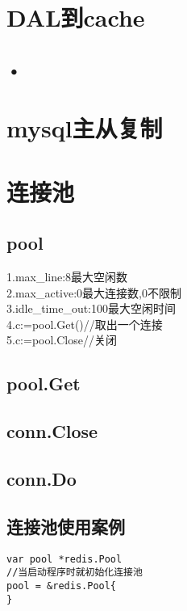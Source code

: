 \documentclass[12pt,a4paper,openany,fleqn]{book} %
\begin{document}
  
\tableofcontents

%
\chapter{DAL到cache}
\section{•}

%
\chapter{mysql主从复制}

%
\chapter{连接池}
\section{pool}
1.max\_line:8最大空闲数\\
2.max\_active:0最大连接数,0不限制\\
3.idle\_time\_out:100最大空闲时间\\
4.c:=pool.Get()//取出一个连接\\
5.c:=pool.Close//关闭

\section{pool.Get}

\section{conn.Close}

\section{conn.Do}

\section{连接池使用案例}
\begin{lstlisting}
var pool *redis.Pool
//当启动程序时就初始化连接池
pool = &redis.Pool{
}
\end{lstlisting}
\end{document}
